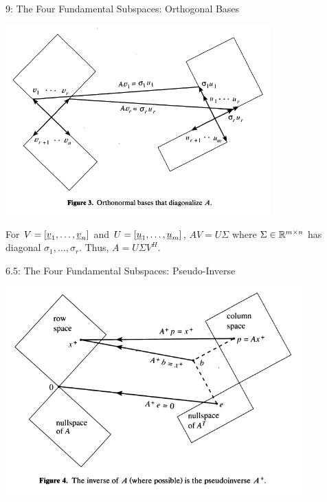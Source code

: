 \documentclass[10pt,letterpaper,english]{beamer}
\begin{document}
\begin{frame}{9: The Four Fundamental Subspaces: Orthogonal Bases}

\vspace{-1mm}
\hspace*{-1mm}
\includegraphics[width=102mm]{figures/strang_fig3}

\vspace{-3mm}
For $V = [\underline{v}_1,\ldots,\underline{v}_n]
$ and $U = [\underline{u}_1,\ldots,\underline{u}_m]$, $A V = U \Sigma$ where $\Sigma \in \mathbb{R}^{m \times n}$ has diagonal $\sigma_1,\ldots,\sigma_r$.  Thus, $A = U \Sigma V^H$.


\let\thefootnote\relax\footnotetext{\hspace*{-4mm} {\tiny Figure from ``The Fundamental Theorem of Linear Algebra'' by Gilbert Strang, The American Mathematical Monthly, Nov. 1993 }}

\end{frame}

\begin{frame}{6.5: The Four Fundamental Subspaces: Pseudo-Inverse}

\hspace*{-4mm}
\includegraphics[width=114mm]{figures/strang_fig4}

\let\thefootnote\relax\footnotetext{\hspace*{-4mm} {\tiny Figure from ``The Fundamental Theorem of Linear Algebra'' by Gilbert Strang, The American Mathematical Monthly, Nov. 1993 }}

\end{frame}
\end{document}
